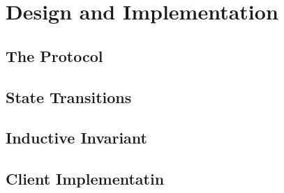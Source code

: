 \chapter{Design and Implementation}

\newpage


\section{The Protocol}

\section{State Transitions}

\section{Inductive Invariant}

\section{Client Implementatin}
